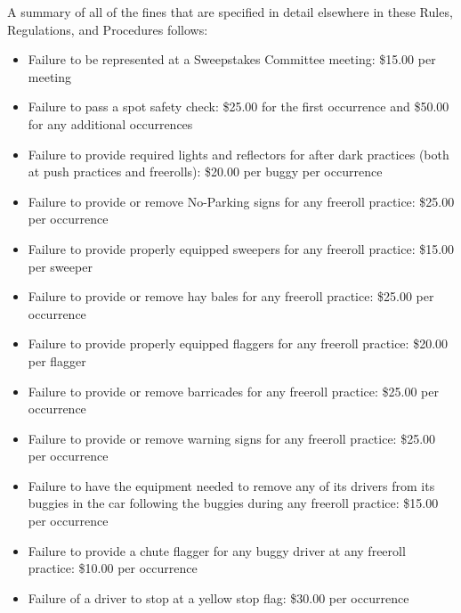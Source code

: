 	A summary of all of the fines that are specified in detail elsewhere in these
	Rules, Regulations, and Procedures follows:

	\begin{itemize}

		\item Failure to be represented at a Sweepstakes Committee meeting: \$15.00
		per meeting

		\item Failure to pass a spot safety check: \$25.00 for the first occurrence
		and \$50.00 for any additional occurrences

		\item Failure to provide required lights and reflectors for after dark
		practices (both at push practices and freerolls): \$20.00 per buggy per
		occurrence

		\item Failure to provide or remove No-Parking signs for any freeroll
		practice: \$25.00 per occurrence

		\item Failure to provide properly equipped sweepers for any freeroll
		practice: \$15.00 per sweeper

		\item Failure to provide or remove hay bales for any freeroll practice:
		\$25.00 per occurrence

		\item Failure to provide properly equipped flaggers for any freeroll
		practice: \$20.00 per flagger

		\item Failure to provide or remove barricades for any freeroll practice:
		\$25.00 per occurrence

		\item Failure to provide or remove warning signs for any freeroll practice:
		\$25.00 per occurrence

		\item Failure to have the equipment needed to remove any of its drivers
		from its buggies in the car following the buggies during any freeroll practice:
		\$15.00 per occurrence

		\item Failure to provide a chute flagger for any buggy driver at any
		freeroll practice: \$10.00 per occurrence

		\item Failure of a driver to stop at a yellow stop flag: \$30.00 per
		occurrence


\end{itemize}
